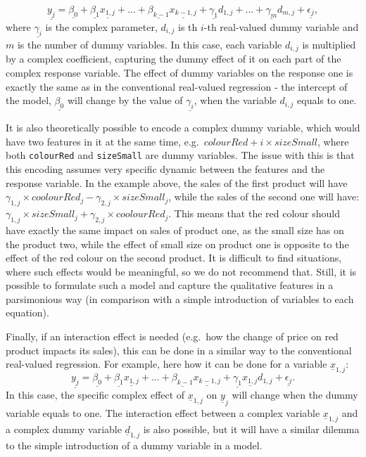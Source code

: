 \documentclass[
]{book}
\begin{document}
\begin{equation}
    \underline{y_j} = \underline{\beta_0} + \underline{\beta_1} \underline{x_{1,j}} + \dots + \underline{\beta_{k-1}} \underline{x_{k-1,j}} + \underline{\gamma_1} d_{1,j} + \dots + \underline{\gamma_m} d_{m,j} + \underline{\epsilon_j},
    \label{eq:MultipleCLRComplexDummy}
\end{equation}
where \(\underline{\gamma_i}\) is the complex parameter, \(d_{i,j}\) is th \(i\)-th real-valued dummy variable and \(m\) is the number of dummy variables. In this case, each variable \(d_{i,j}\) is multiplied by a complex coefficient, capturing the dummy effect of it on each part of the complex response variable. The effect of dummy variables on the response one is exactly the same as in the conventional real-valued regression - the intercept of the model, \(\underline{\beta_0}\) will change by the value of \(\underline{\gamma_i}\), when the variable \(d_{i,j}\) equals to one.

It is also theoretically possible to encode a complex dummy variable, which would have two features in it at the same time, e.g.~\(colourRed + i \times sizeSmall\), where both \texttt{colourRed} and \texttt{sizeSmall} are dummy variables. The issue with this is that this encoding assumes very specific dynamic between the features and the response variable. In the example above, the sales of the first product will have \(\gamma_{1,j} \times coolourRed_j - \gamma_{2,j} \times sizeSmall_j\), while the sales of the second one will have: \(\gamma_{1,j} \times sizeSmall_j + \gamma_{2,j} \times coolourRed_j\). This means that the red colour should have exactly the same impact on sales of product one, as the small size has on the product two, while the effect of small size on product one is opposite to the effect of the red colour on the second product. It is difficult to find situations, where such effects would be meaningful, so we do not recommend that. Still, it is possible to formulate such a model and capture the qualitative features in a parsimonious way (in comparison with a simple introduction of variables to each equation).

Finally, if an interaction effect is needed (e.g.~how the change of price on red product impacts its sales), this can be done in a similar way to the conventional real-valued regression. For example, here how it can be done for a variable \(\underline{x}_{1,j}\):
\begin{equation}
    \underline{y_j} = \underline{\beta_0} + \underline{\beta_1} \underline{x_{1,j}} + \dots + \underline{\beta_{k-1}} \underline{x_{k-1,j}} + \underline{\gamma_1} \underline{x_{1,j}} d_{1,j} + \underline{\epsilon_j} .
    \label{eq:MultipleCLRComplexDummyInteraction}
\end{equation}
In this case, the specific complex effect of \(\underline{x}_{1,j}\) on \(\underline{y}_j\) will change when the dummy variable equals to one. The interaction effect between a complex variable \(\underline{x}_{1,j}\) and a complex dummy variable \(\underline{d}_{1,j}\) is also possible, but it will have a similar dilemma to the simple introduction of a dummy variable in a model.
\end{document}
